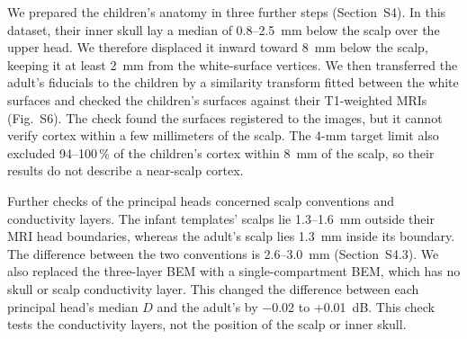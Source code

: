 \documentclass[preprint,12pt,authoryear,a4paper]{elsarticle}
\begin{document}
We prepared the children's anatomy in three further steps (Section~S4). In this dataset, their inner skull lay a median of 0.8–2.5~mm below the scalp over the upper head. We therefore displaced it inward toward 8~mm below the scalp, keeping it at least 2~mm from the white-surface vertices. We then transferred the adult's fiducials to the children by a similarity transform fitted between the white surfaces and checked the children's surfaces against their T1-weighted MRIs (Fig.~S6). The check found the surfaces registered to the images, but it cannot verify cortex within a few millimeters of the scalp. The 4-mm target limit also excluded 94–100\,\% of the children's cortex within 8~mm of the scalp, so their results do not describe a near-scalp cortex.

Further checks of the principal heads concerned scalp conventions and conductivity layers. The infant templates' scalps lie 1.3–1.6~mm outside their MRI head boundaries, whereas the adult's scalp lies 1.3~mm inside its boundary. The difference between the two conventions is 2.6–3.0~mm (Section~S4.3). We also replaced the three-layer BEM with a single-compartment BEM, which has no skull or scalp conductivity layer. This changed the difference between each principal head's median $D$ and the adult's by −0.02 to +0.01~dB. This check tests the conductivity layers, not the position of the scalp or inner skull.
\end{document}
